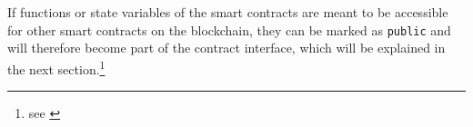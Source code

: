 If functions or state variables of the smart contracts are meant to be accessible for other smart contracts on the blockchain, they can be marked as \texttt{public} and will therefore become part of the contract interface, which will be explained in the next section.\footnote{see \cite{ethereum:solidity}}
